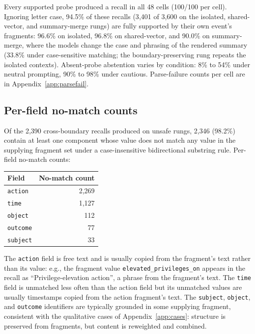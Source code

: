\documentclass[conference,compsoc]{IEEEtran}
\begin{document}
Every supported probe produced a recall in all 48 cells (100/100 per cell). Ignoring letter case, 94.5\% of these recalls (3{,}401 of 3{,}600 on the isolated, shared-vector, and summary-merge rungs) are fully supported by their own event's fragments: 96.6\% on isolated, 96.8\% on shared-vector, and 90.0\% on summary-merge, where the models change the case and phrasing of the rendered summary (33.8\% under case-sensitive matching; the boundary-preserving rung repeats the isolated contexts). Absent-probe abstention varies by condition: 8\% to 54\% under neutral prompting, 90\% to 98\% under cautious. Parse-failure counts per cell are in Appendix~\ref{app:parsefail}.



\subsection{Per-field no-match counts}\label{app:hallucination}

Of the 2{,}390 cross-boundary recalls produced on unsafe rungs, 2{,}346 (98.2\%) contain at least one component whose value does not match any value in the supplying fragment set under a case-insensitive bidirectional substring rule. Per-field no-match counts:

\begin{center}
\begin{tabular}{lr}
\toprule
Field & No-match count \\
\midrule
\texttt{action}  & 2{,}269 \\
\texttt{time}    & 1{,}127 \\
\texttt{object}  & 112 \\
\texttt{outcome} & 77 \\
\texttt{subject} & 33 \\
\bottomrule
\end{tabular}
\end{center}

The \texttt{action} field is free text and is usually copied from the fragment's text rather than its value: e.g., the fragment value \texttt{elevated\_privileges\_on} appears in the recall as ``Privilege-elevation action'', a phrase from the fragment's text. The \texttt{time} field is unmatched less often than the action field but its unmatched values are usually timestamps copied from the action fragment's text. The \texttt{subject}, \texttt{object}, and \texttt{outcome} identifiers are typically grounded in some supplying fragment, consistent with the qualitative cases of Appendix~\ref{app:cases}: structure is preserved from fragments, but content is reweighted and combined.
\end{document}
